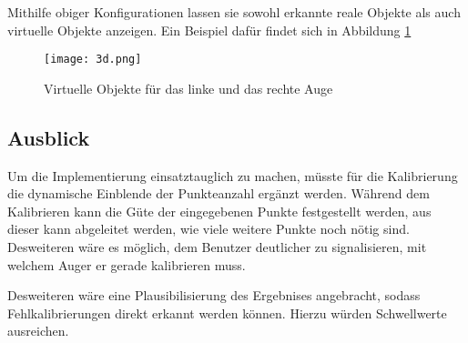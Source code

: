 Mithilfe obiger Konfigurationen lassen sie sowohl erkannte reale Objekte als auch virtuelle Objekte anzeigen.  Ein Beispiel dafür findet sich in Abbildung \ref{fig:Virtuelle Quadrate aus Prezi}

\begin{figure}[h]
   \centering
   \texttt{[image: 3d.png]}
   \caption{Virtuelle Objekte für das linke und das rechte Auge}
   \label{fig:Virtuelle Quadrate aus Prezi}
\end{figure}

\subsection{Ausblick}
Um die Implementierung einsatztauglich zu machen, müsste für die Kalibrierung die dynamische Einblende der Punkteanzahl ergänzt werden. Während dem Kalibrieren kann die Güte der eingegebenen Punkte festgestellt werden, aus dieser kann abgeleitet werden, wie viele weitere Punkte noch nötig sind. Desweiteren wäre es möglich, dem Benutzer deutlicher zu signalisieren, mit welchem Auger er gerade kalibrieren muss.

Desweiteren wäre eine Plausibilisierung des Ergebnises angebracht, sodass Fehlkalibrierungen direkt erkannt werden können. Hierzu würden Schwellwerte ausreichen.

